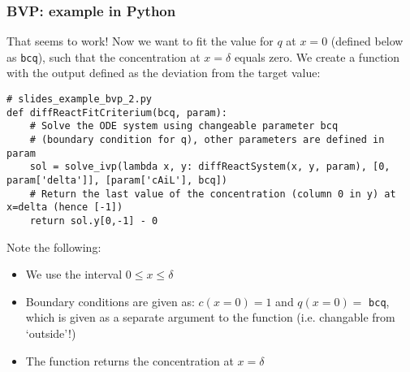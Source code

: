 \begin{frame}[label=diffreactfitcrit,fragile]
  \frametitle{BVP: example in Python}
  That seems to work! Now we want to fit the value for $q$ at $x=0$ (defined below as \lstinline$bcq$), such that the concentration at $x=\delta$ equals zero. We create a function with the output defined as the deviation from the target value:
  \begin{lstlisting}
# slides_example_bvp_2.py
def diffReactFitCriterium(bcq, param):
    # Solve the ODE system using changeable parameter bcq 
    # (boundary condition for q), other parameters are defined in param
    sol = solve_ivp(lambda x, y: diffReactSystem(x, y, param), [0, param['delta']], [param['cAiL'], bcq])
    # Return the last value of the concentration (column 0 in y) at x=delta (hence [-1])
    return sol.y[0,-1] - 0
  \end{lstlisting}
  \pause
  Note the following:
  \begin{itemize}
    \item We use the interval $0\leq x \leq \delta$
    \item Boundary conditions are given as: $c(x=0)=1$ and $q(x=0)=$ \lstinline$bcq$, which is given as a separate argument to the function (i.e. changable from `outside'!)
    \item The function returns the concentration at $x=\delta$
  \end{itemize}
\end{frame}

